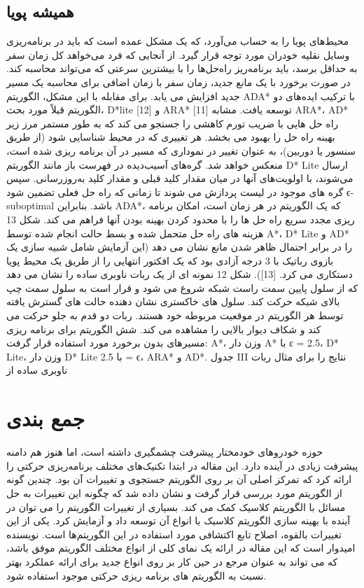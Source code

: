 \subsection{همیشه پویا}
محیط‌های پویا را به حساب می‌آورد، که یک مشکل عمده است که باید در برنامه‌ریزی وسایل نقلیه خودران مورد توجه قرار گیرد. از آنجایی که فرد می‌خواهد کل زمان سفر به حداقل برسد، باید برنامه‌ریز راه‌حل‌ها را با بیشترین سرعتی که می‌تواند محاسبه کند. در صورت برخورد با یک مانع جدید، زمان سفر با زمان اضافی برای محاسبه یک مسیر جدید افزایش می یابد. برای مقابله با این مشکل، الگوریتم ADA* با ترکیب ایده‌های دو الگوریتم قبلاً مورد بحث، D*lite [12] و ARA* [11] توسعه یافت. مشابه ARA*، AD* راه حل هایی با ضریب تورم کاهشی را جستجو می کند که به طور مستمر مرز زیر بهینه راه حل را بهبود می بخشد. هر تغییری که در محیط شناسایی شود (از طریق سنسور یا دوربین)، به عنوان تغییر در نموداری که مسیر در آن برنامه ریزی شده است، منعکس خواهد شد. گره‌های آسیب‌دیده در فهرست باز مانند الگوریتم D* Lite ارسال می‌شوند، با اولویت‌های آنها در میان مقدار کلید قبلی و مقدار کلید به‌روزرسانی. سپس گره های موجود در لیست پردازش می شوند تا زمانی که راه حل فعلی تضمین شود ϵ-suboptimal باشد. بنابراین ADA*، که یک الگوریتم در هر زمان است، امکان برنامه ریزی مجدد سریع راه حل ها را با محدود کردن بهینه بودن آنها فراهم می کند. شکل 13 هزینه های راه حل متحمل شده و بسط حالت انجام شده توسط A*، D* Lite و AD* را در برابر احتمال ظاهر شدن مانع نشان می دهد (این آزمایش شامل شبیه سازی یک بازوی رباتیک با 3 درجه آزادی بود که یک افکتور انتهایی را از طریق یک محیط پویا دستکاری می کرد. [13]). شکل 12 نمونه ای از یک ربات ناوبری ساده را نشان می دهد که از سلول پایین سمت راست شبکه شروع می شود و قرار است به سلول سمت چپ بالای شبکه حرکت کند. سلول های خاکستری نشان دهنده حالت های گسترش یافته توسط هر الگوریتم در موقعیت مربوطه خود هستند. ربات دو قدم به جلو حرکت می کند و شکاف دیوار بالایی را مشاهده می کند. شش الگوریتم برای برنامه ریزی مسیرهای بدون برخورد مورد استفاده قرار گرفت: A*، وزن دار A* با ε = 2.5، D* Lite، وزن دار D* Lite با 2.5 = ϵ، ARA* و AD*. جدول III نتایج را برای مثال ربات ناوبری ساده از

\section{جمع بندی}

حوزه خودروهای خودمختار پیشرفت چشمگیری داشته است، اما هنوز هم دامنه پیشرفت زیادی در آینده دارد. این مقاله در ابتدا تکنیک‌های مختلف برنامه‌ریزی حرکتی را ارائه کرد که تمرکز اصلی آن بر روی الگوریتم جستجوی  و تغییرات آن بود. چندین گونه از الگوریتم   مورد بررسی قرار گرفت و نشان داده شد که چگونه این تغییرات به حل مسائل با الگوریتم کلاسیک  کمک می کند. بسیاری از تغییرات الگوریتم   را می توان در آینده با بهینه سازی الگوریتم کلاسیک یا انواع آن توسعه داد و آزمایش کرد. یکی از این تغییرات بالقوه، اصلاح تابع اکتشافی مورد استفاده در این الگوریتم‌ها است. نویسنده امیدوار است که این مقاله در ارائه یک نمای کلی از انواع مختلف الگوریتم   موفق باشد، که می تواند به عنوان مرجع در حین کار بر روی انواع جدید برای ارائه عملکرد بهتر نسبت به الگوریتم های برنامه ریزی حرکتی موجود استفاده شود.





